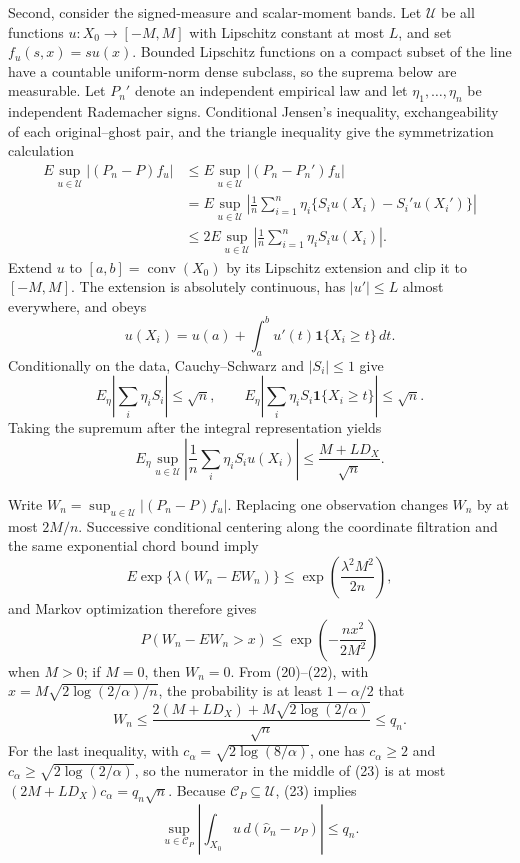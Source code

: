 Second, consider the signed-measure and scalar-moment bands. Let \(\mathcal U\) be all functions \(u:X_0\to[-M,M]\) with Lipschitz constant at most \(L\), and set \(f_u(s,x)=su(x)\). Bounded Lipschitz functions on a compact subset of the line have a countable uniform-norm dense subclass, so the suprema below are measurable. Let \(P_n'\) denote an independent empirical law and let \(\eta_1,\ldots,\eta_n\) be independent Rademacher signs. Conditional Jensen's inequality, exchangeability of each original--ghost pair, and the triangle inequality give the symmetrization calculation
\[
\begin{aligned}
 E\sup_{u\in\mathcal U}|(P_n-P)f_u|
 &\leq E\sup_{u\in\mathcal U}|(P_n-P_n')f_u|\\
 &=E\sup_{u\in\mathcal U}\left|\frac1n\sum_{i=1}^n
 \eta_i\{S_iu(X_i)-S_i'u(X_i')\}\right|\\
 &\leq2E\sup_{u\in\mathcal U}\left|\frac1n\sum_{i=1}^n\eta_iS_iu(X_i)\right|. \tag{20}
\end{aligned}
\]
Extend \(u\) to \([a,b]=\operatorname{conv}(X_0)\) by its Lipschitz extension and clip it to \([-M,M]\). The extension is absolutely continuous, has \(|u'|\leq L\) almost everywhere, and obeys
\[
 u(X_i)=u(a)+\int_a^b u'(t)\mathbf1\{X_i\geq t\}\,dt.
\]
Conditionally on the data, Cauchy--Schwarz and \(|S_i|\leq1\) give
\[
 E_\eta\left|\sum_i\eta_iS_i\right|\leq\sqrt n,
 \qquad
 E_\eta\left|\sum_i\eta_iS_i\mathbf1\{X_i\geq t\}\right|\leq\sqrt n.
\]
Taking the supremum after the integral representation yields
\[
 E_\eta\sup_{u\in\mathcal U}
 \left|\frac1n\sum_i\eta_iS_iu(X_i)\right|
 \leq\frac{M+LD_X}{\sqrt n}.                                    \tag{21}
\]

Write \(W_n=\sup_{u\in\mathcal U}|(P_n-P)f_u|\). Replacing one observation changes \(W_n\) by at most \(2M/n\). Successive conditional centering along the coordinate filtration and the same exponential chord bound imply
\[
 E\exp\{\lambda(W_n-EW_n)\}\leq
 \exp\!\left(\frac{\lambda^2M^2}{2n}\right),
\]
and Markov optimization therefore gives
\[
 P(W_n-EW_n>x)\leq\exp\!\left(-\frac{nx^2}{2M^2}\right)          \tag{22}
\]
when \(M>0\); if \(M=0\), then \(W_n=0\). From (20)--(22), with \(x=M\sqrt{2\log(2/\alpha)/n}\), the probability is at least \(1-\alpha/2\) that
\[
 W_n\leq\frac{2(M+LD_X)+M\sqrt{2\log(2/\alpha)}}{\sqrt n}\leq q_n. \tag{23}
\]
For the last inequality, with \(c_\alpha=\sqrt{2\log(8/\alpha)}\), one has \(c_\alpha\geq2\) and \(c_\alpha\geq\sqrt{2\log(2/\alpha)}\), so the numerator in the middle of (23) is at most \((2M+LD_X)c_\alpha=q_n\sqrt n\). Because \(\mathcal C_P\subseteq\mathcal U\), (23) implies
\[
 \sup_{u\in\mathcal C_P}
 \left|\int_{X_0}u\,d(\widehat\nu_n-\nu_P)\right|\leq q_n.       \tag{24}
\]

